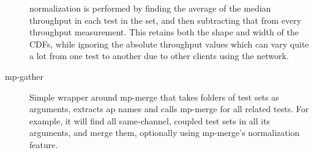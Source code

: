 \begin{description}
    normalization is performed by finding the average of the median throughput
    in each test in the set, and then subtracting that from every throughput
    measurement. This retains both the shape and width of the CDFs, while
    ignoring the absolute throughput values which can vary quite a lot from one
    test to another due to other clients using the network.
  \item[mp-gather]
    Simple wrapper around mp-merge that takes folders of test sets as arguments,
    extracts ap names and calls mp-merge for all related tests. For example, it
    will find all same-channel, coupled test sets in all its arguments, and
    merge them, optionally using mp-merge's normalization feature.
\end{description}
